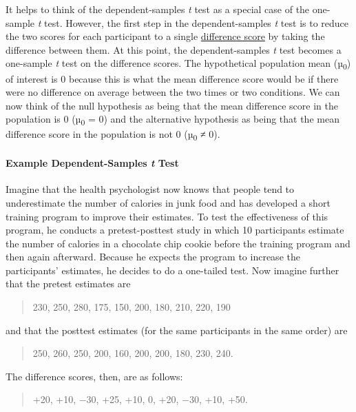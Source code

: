 \documentclass[
]{krantz}
\begin{document}
It helps to think of the dependent-samples \emph{t} test as a special case of the one-sample \emph{t} test. However, the first step in the dependent-samples \emph{t} test is to reduce the two scores for each participant to a single \hyperref[difference-score]{difference score} by taking the difference between them. At this point, the dependent-samples \emph{t} test becomes a one-sample \emph{t} test on the difference scores. The hypothetical population mean (µ\textsubscript{0}) of interest is 0 because this is what the mean difference score would be if there were no difference on average between the two times or two conditions. We can now think of the null hypothesis as being that the mean difference score in the population is 0 (µ\textsubscript{0} = 0) and the alternative hypothesis as being that the mean difference score in the population is not 0 (µ\textsubscript{0} ≠ 0).

\paragraph*{\texorpdfstring{Example Dependent-Samples \emph{t} Test}{Example Dependent-Samples t Test}}\label{example-dependent-samples-t-test}

Imagine that the health psychologist now knows that people tend to underestimate the number of calories in junk food and has developed a short training program to improve their estimates. To test the effectiveness of this program, he conducts a pretest-posttest study in which 10 participants estimate the number of calories in a chocolate chip cookie before the training program and then again afterward. Because he expects the program to increase the participants' estimates, he decides to do a one-tailed test. Now imagine further that the pretest estimates are

\begin{quote}
230, 250, 280, 175, 150, 200, 180, 210, 220, 190
\end{quote}

and that the posttest estimates (for the same participants in the same order) are

\begin{quote}
250, 260, 250, 200, 160, 200, 200, 180, 230, 240.
\end{quote}

The difference scores, then, are as follows:

\begin{quote}
+20, +10, −30, +25, +10, 0, +20, −30, +10, +50.
\end{quote}
\end{document}
